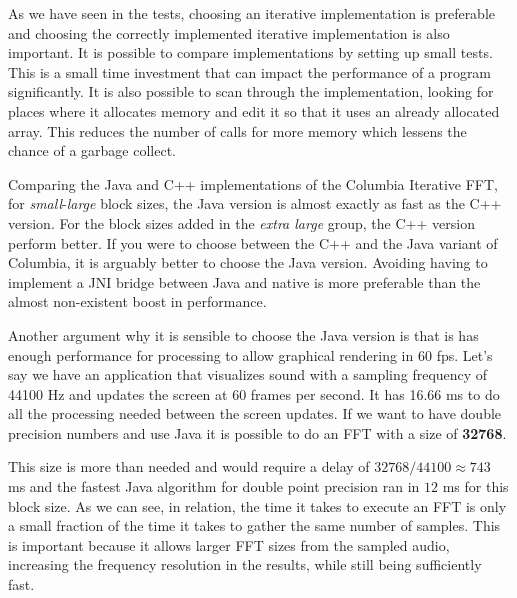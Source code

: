 As we have seen in the tests, choosing an iterative implementation is preferable and choosing the correctly implemented iterative implementation is also important. It is possible to compare implementations by setting up small tests. This is a small time investment that can impact the performance of a program significantly. It is also possible to scan through the implementation, looking for places where it allocates memory and edit it so that it uses an already allocated array. This reduces the number of calls for more memory which lessens the chance of a garbage collect.



Comparing the Java and C++ implementations of the Columbia Iterative FFT, for \emph{small}-\emph{large} block sizes, the Java version is almost exactly as fast as the C++ version. For the block sizes added in the \emph{extra large} group, the C++ version perform better. If you were to choose between the C++ and the Java variant of Columbia, it is arguably better to choose the Java version. Avoiding having to implement a JNI bridge between Java and native is more preferable than the almost non-existent boost in performance.

Another argument why it is sensible to choose the Java version is that is has enough performance for processing to allow graphical rendering in 60 \gls{fps}. Let's say we have an application that visualizes sound with a sampling frequency of 44100 Hz and updates the screen at 60 frames per second. It has 16.66 ms to do all the processing needed between the screen updates. If we want to have double precision numbers and use Java it is possible to do an FFT with a size of \textbf{32768}.

This size is more than needed and would require a delay of $32768/44100\approx 743 $ ms and the fastest Java algorithm for double point precision ran in $12$ ms for this block size. As we can see, in relation, the time it takes to execute an FFT is only a small fraction of the time it takes to gather the same number of samples. This is important because it allows larger FFT sizes from the sampled audio, increasing the frequency resolution in the results, while still being sufficiently fast.

